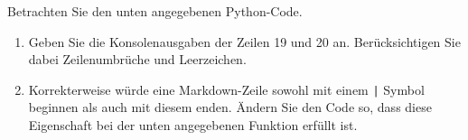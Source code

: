 Betrachten Sie den unten angegebenen Python-Code.
\begin{enumerate}
	\item Geben Sie die Konsolenausgaben der Zeilen 19 und 20 an. Berücksichtigen Sie dabei Zeilenumbrüche und Leerzeichen.
	\item Korrekterweise würde eine Markdown-Zeile sowohl mit einem \verb$|$ Symbol beginnen als auch mit diesem enden.
	Ändern Sie den Code so, dass diese Eigenschaft bei der unten angegebenen Funktion erfüllt ist.
\end{enumerate}

